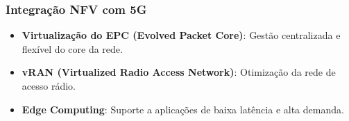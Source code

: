 \begin{frame}
    \frametitle{Integração NFV com 5G}
    \begin{itemize}
        \item \textbf{Virtualização do EPC (Evolved Packet Core)}: Gestão centralizada e flexível do core da rede.
        \item \textbf{vRAN (Virtualized Radio Access Network)}: Otimização da rede de acesso rádio.
        \item \textbf{Edge Computing}: Suporte a aplicações de baixa latência e alta demanda.
    \end{itemize}
\end{frame}